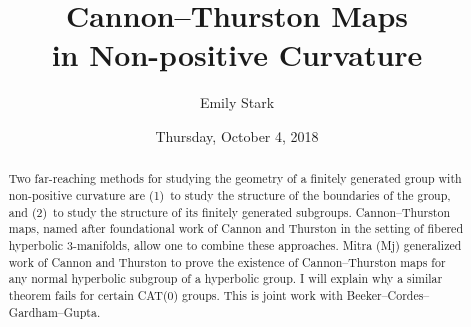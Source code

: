 \documentclass{UAmathtalk}
\author{Emily Stark}
\title{Cannon--Thurston Maps\\ in Non-positive Curvature}
\date{Thursday, October 4, 2018}
\begin{document}
\maketitle

\begin{abstract}
Two far-reaching methods for studying the geometry of a finitely generated group with non-positive curvature are (1)~to study the structure of the boundaries of the group, and (2)~to study the structure of its finitely generated subgroups. Cannon--Thurston maps, named after foundational work of Cannon and Thurston in the setting of fibered hyperbolic 3-manifolds, allow one to combine these approaches. Mitra (Mj) generalized work of Cannon and Thurston to prove the existence of Cannon--Thurston maps for any normal hyperbolic subgroup of a hyperbolic group. I will explain why a similar theorem fails for certain CAT(0) groups. This is joint work with Beeker--Cordes--Gardham--Gupta.
\end{abstract}
\end{document}
